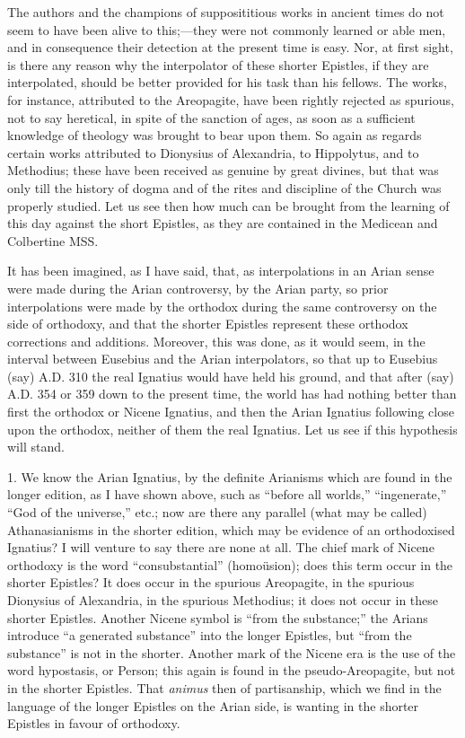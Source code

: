 The authors and the champions
of supposititious works in ancient times do not seem to have been
alive to this;—they were not commonly learned or able men, and in
consequence their detection at the present time is easy. Nor, at first
sight, is there any reason why the interpolator of these shorter
Epistles, if they are interpolated, should be better provided for his
task than his fellows. The works, for instance, attributed to the
Areopagite, have been rightly rejected as spurious, not to say
heretical, in spite of the sanction of ages, as soon as a sufficient
knowledge of theology was brought to bear upon them. So again as
regards certain works attributed to Dionysius of Alexandria, to
Hippolytus, and to Methodius; these have been received as genuine by
great divines, but that was only till the history of dogma and of the
rites and discipline of the Church was properly studied. Let us see
then how much can be brought from the learning of this day against the
short Epistles, as they are contained in the Medicean and Colbertine
MSS.

It has been imagined, as I
have said, that, as interpolations in an Arian sense were made during
the Arian controversy, by the Arian party, so prior interpolations
were made by the orthodox during the same controversy on the side of
orthodoxy, and that the shorter Epistles represent these orthodox
corrections and additions. Moreover, this was done, as it would seem,
in the interval between Eusebius and the Arian interpolators, so that
up to Eusebius (say) A.D. 310 the real Ignatius
would have held his ground, and that after (say) A.D.
354 or 359 down to the present time, the world has had nothing better
than first the orthodox or Nicene Ignatius, and then the Arian
Ignatius following close upon the orthodox, neither of them the real
Ignatius. Let us see if this hypothesis will stand.

1. We know the Arian Ignatius,
by the definite Arianisms which are found in the longer edition, as I
have shown above, such as ``before all worlds,'' ``ingenerate,'' ``God of
the universe,'' etc.; now are there any parallel (what may be called)
Athanasianisms in the shorter edition, which may be evidence of an
orthodoxised Ignatius? I will venture to say there are none at all.
The chief mark of Nicene orthodoxy is the word ``consubstantial'' (homoüsion);
does this term occur in the shorter Epistles? It does occur in the
spurious Areopagite, in the spurious Dionysius of Alexandria, in the
spurious Methodius; it does not occur in these shorter Epistles.
Another Nicene symbol is ``from the substance;'' the Arians introduce ``a
generated substance'' into the longer Epistles, but ``from the substance''
is not in the shorter. Another mark of the Nicene era is the use of
the word hypostasis, or Person; this again is found in the pseudo-Areopagite,
but not in the shorter Epistles. That \emph{animus} then of
partisanship, which we find in the language of the longer Epistles on
the Arian side, is wanting in the shorter Epistles in favour of
orthodoxy.

